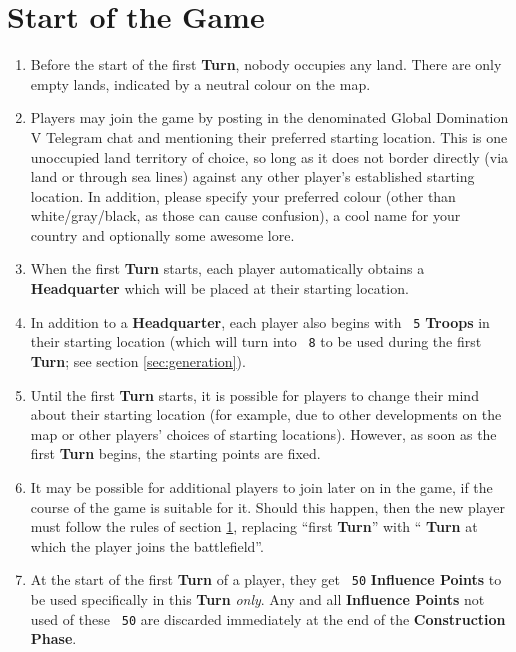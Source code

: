 \documentclass[10pt,openright,a4paper,openany]{article}
\newcommand{\num}[1]{\texttt{\color{purple} {#1}}}
\newcommand{\term}[1]{\textbf{\color{purple} #1}}
\newcommand{\headquarter}{\term{Headquarter}}
\begin{document}
\section{Start of the Game}\label{sec:start}
\begin{enumerate}
	\item Before the start of the first \term{Turn}, nobody occupies any land. There are only empty lands, indicated by a neutral colour on the map.
	\item Players may join the game by posting in the denominated Global Domination V Telegram chat and mentioning their preferred starting location. This is one unoccupied land territory of choice, so long as it does not border directly (via land or through sea lines) against any other player's established starting location. In addition, please specify your preferred colour (other than white/gray/black, as those can cause confusion), a cool name for your country and optionally some awesome lore.
	\item When the first \term{Turn} starts, each player automatically obtains a \headquarter{} which will be placed at their starting location.
	\item In addition to a \headquarter{}, each player also begins with \num{5} \term{Troops} in their starting location (which will turn into \num{8} to be used during the first \term{Turn}; see section \ref{sec:generation}).
	\item Until the first \term{Turn} starts, it is possible for players to change their mind about their starting location (for example, due to other developments on the map or other players' choices of starting locations). However, as soon as the first \term{Turn} begins, the starting points are fixed.
	\item It may be possible for additional players to join later on in the game, if the course of the game is suitable for it. Should this happen, then the new player must follow the rules of section \ref{sec:start}, replacing ``first \term{Turn}'' with ``\term{Turn} at which the player joins the battlefield''.
	\item At the start of the first \term{Turn} of a player, they get \num{50} \term{Influence Points} to be used specifically in this \term{Turn} \emph{only}. Any and all \term{Influence Points} not used of these \num{50} are discarded immediately at the end of the \term{Construction Phase}.
\end{enumerate}
\end{document}

